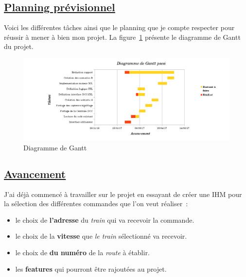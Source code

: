 \newpage

\subsection{\underline{Planning pr\'evisionnel}}
\label{sec:planning}

Voici les différentes t\^aches ainsi que le planning que je compte
respecter pour r\'eussir \`a mener \`a bien mon projet. La
figure~\ref{gantt} pr\'esente le diagramme de Gantt du projet.

\begin{figure}[h]
\centering
\includegraphics[scale=0.5]{gantt.png}
\caption{Diagramme de Gantt}
\label{gantt}
\end{figure}


\subsection{\underline{Avancement}}
\label{sec:avanc}

J'ai d\'ej\`a commenc\'e \`a travailler sur le projet en essayant de
cr\'eer une IHM pour la s\'election des diff\'erentes commandes que l'on
veut r\'ealiser~:

\begin{itemize}
    \item le choix de \textbf{l'adresse} du \emph{train} qui va
      recevoir la commande. 
    \item le choix de la \textbf{vitesse} que \emph{le train} s\'electionn\'e
      va recevoir. 
    \item le choix de \textbf{du numéro} de la \emph{route} \`a \'etablir.
    \item les \textbf{features} qui pourront \^etre rajout\'ees au
      projet. 
  \end{itemize}

